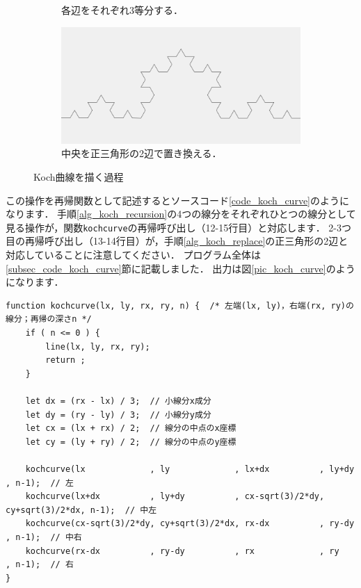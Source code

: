 \documentclass[dvipdfmx]{jsarticle}
\theoremstyle{definition}
\begin{document}
\begin{figure}[H]
\begin{subfigure}{0.325\textwidth}
        \caption{各辺をそれぞれ3等分する．}
        \label{fig_proc_kochcurve2_split}
    \end{subfigure}
    \begin{subfigure}{0.325\textwidth}
        \centering
        \includegraphics[width=\textwidth]{figure/koch/koch_curve3.png}
        \caption{中央を正三角形の2辺で置き換える．}
        \label{fig_proc_kochcurve3}
    \end{subfigure}
    \caption{Koch曲線を描く過程}
    \label{fig_process_koch_curve}
\end{figure}
%
この操作を再帰関数として記述するとソースコード\ref{code_koch_curve}のようになります．
手順\ref{alg_koch_recursion}の4つの線分をそれぞれひとつの線分として見る操作が，関数\verb|kochcurve|の再帰呼び出し（12-15行目）と対応します．
2-3つ目の再帰呼び出し（13-14行目）が，手順\ref{alg_koch_replace}の正三角形の2辺と対応していることに注意してください．
プログラム全体は\ref{subsec_code_koch_curve}節に記載しました．
出力は図\ref{pic_koch_curve}のようになります．
%
\begin{lstlisting}[caption=Koch曲線を描く再帰関数, label=code_koch_curve]
function kochcurve(lx, ly, rx, ry, n) {  /* 左端(lx, ly)，右端(rx, ry)の線分；再帰の深さn */
    if ( n <= 0 ) {
        line(lx, ly, rx, ry);
        return ;
    }

    let dx = (rx - lx) / 3;  // 小線分x成分
    let dy = (ry - ly) / 3;  // 小線分y成分
    let cx = (lx + rx) / 2;  // 線分の中点のx座標
    let cy = (ly + ry) / 2;  // 線分の中点のy座標

    kochcurve(lx             , ly             , lx+dx          , ly+dy          , n-1);  // 左
    kochcurve(lx+dx          , ly+dy          , cx-sqrt(3)/2*dy, cy+sqrt(3)/2*dx, n-1);  // 中左
    kochcurve(cx-sqrt(3)/2*dy, cy+sqrt(3)/2*dx, rx-dx          , ry-dy          , n-1);  // 中右
    kochcurve(rx-dx          , ry-dy          , rx             , ry             , n-1);  // 右
}
\end{lstlisting}
\end{document}
